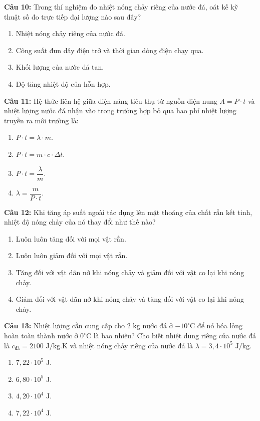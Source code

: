\documentclass[12pt,a4paper]{article}
\begin{document}
\textbf{Câu 10:} Trong thí nghiệm đo nhiệt nóng chảy riêng của nước đá, oát kế kỹ thuật số đo trực tiếp đại lượng nào sau đây?
\begin{enumerate}[label=\Alph*.]
  \item Nhiệt nóng chảy riêng của nước đá.
  \item Công suất đun dây điện trở và thời gian dòng điện chạy qua.
  \item Khối lượng của nước đá tan.
  \item Độ tăng nhiệt độ của hỗn hợp.
\end{enumerate}

\textbf{Câu 11:} Hệ thức liên hệ giữa điện năng tiêu thụ từ nguồn điện nung $A = P \cdot t$ và nhiệt lượng nước đá nhận vào trong trường hợp bỏ qua hao phí nhiệt lượng truyền ra môi trường là:
\begin{enumerate}[label=\Alph*.]
  \item $P \cdot t = \lambda \cdot m$.
  \item $P \cdot t = m \cdot c \cdot \Delta t$.
  \item $P \cdot t = \dfrac{\lambda}{m}$.
  \item $\lambda = \dfrac{m}{P \cdot t}$.
\end{enumerate}

\textbf{Câu 12:} Khi tăng áp suất ngoài tác dụng lên mặt thoáng của chất rắn kết tinh, nhiệt độ nóng chảy của nó thay đổi như thế nào?
\begin{enumerate}[label=\Alph*.]
  \item Luôn luôn tăng đối với mọi vật rắn.
  \item Luôn luôn giảm đối với mọi vật rắn.
  \item Tăng đối với vật dãn nở khi nóng chảy và giảm đối với vật co lại khi nóng chảy.
  \item Giảm đối với vật dãn nở khi nóng chảy và tăng đối với vật co lại khi nóng chảy.
\end{enumerate}

\textbf{Câu 13:} Nhiệt lượng cần cung cấp cho $2\text{ kg}$ nước đá ở $-10^{\circ}\text{C}$ để nó hóa lỏng hoàn toàn thành nước ở $0^{\circ}\text{C}$ là bao nhiêu? Cho biết nhiệt dung riêng của nước đá là $c_{đá} = 2100\text{ J/kg.K}$ và nhiệt nóng chảy riêng của nước đá là $\lambda = 3{,}4 \cdot 10^5\text{ J/kg}$.
\begin{enumerate}[label=\Alph*.]
  \item $7{,}22 \cdot 10^5\text{ J}$.
  \item $6{,}80 \cdot 10^5\text{ J}$.
  \item $4{,}20 \cdot 10^4\text{ J}$.
  \item $7{,}22 \cdot 10^4\text{ J}$.
\end{enumerate}
\end{document}
